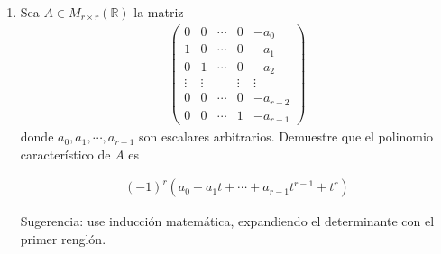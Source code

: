 \documentclass[11pt,letterpaper]{article}
\newcommand{\mR}{\mathbb{R}}
\begin{document}
\begin{enumerate}
  
\item Sea $A\in M_{r\times r} (\mR)$ la matriz
\begin{align*}
\begin{pmatrix}
0 & 0 & \cdots & 0 & -a_0\\
1 & 0 & \cdots & 0 & -a_1\\
0 & 1 & \cdots & 0 & -a_2\\
\vdots & \vdots &  & \vdots &\vdots\\
0 & 0 & \cdots & 0 & -a_{r-2}\\
0 & 0 & \cdots & 1 & -a_{r-1}
\end{pmatrix}
\end{align*}
donde $a_0, a_1, \cdots, a_{r-1}$ son escalares arbitrarios. Demuestre que el polinomio característico de $A$ es 

\begin{align*}
(-1)^r(a_0+a_1t+\cdots+a_{r-1}t^{r-1}+t^r)
\end{align*}

Sugerencia: use inducción matemática, expandiendo el determinante con el primer renglón.


\end{enumerate}
\end{document}
